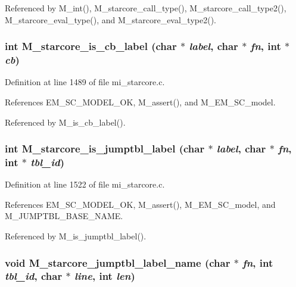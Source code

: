 Referenced by M\_\-int(), M\_\-starcore\_\-call\_\-type(), M\_\-starcore\_\-call\_\-type2(), M\_\-starcore\_\-eval\_\-type(), and M\_\-starcore\_\-eval\_\-type2().
\subsubsection{\setlength{\rightskip}{0pt plus 5cm}int M\_\-starcore\_\-is\_\-cb\_\-label (char $\ast$ {\em label}, char $\ast$ {\em fn}, int $\ast$ {\em cb})}\label{m__starcore_8h_66167aef621ee91b3dbbf9a29b918aa9}




Definition at line 1489 of file mi\_\-starcore.c.

References EM\_\-SC\_\-MODEL\_\-OK, M\_\-assert(), and M\_\-EM\_\-SC\_\-model.

Referenced by M\_\-is\_\-cb\_\-label().
\subsubsection{\setlength{\rightskip}{0pt plus 5cm}int M\_\-starcore\_\-is\_\-jumptbl\_\-label (char $\ast$ {\em label}, char $\ast$ {\em fn}, int $\ast$ {\em tbl\_\-id})}\label{m__starcore_8h_812a1b48518c064ee77487911f1d4bb1}




Definition at line 1522 of file mi\_\-starcore.c.

References EM\_\-SC\_\-MODEL\_\-OK, M\_\-assert(), M\_\-EM\_\-SC\_\-model, and M\_\-JUMPTBL\_\-BASE\_\-NAME.

Referenced by M\_\-is\_\-jumptbl\_\-label().
\subsubsection{\setlength{\rightskip}{0pt plus 5cm}void M\_\-starcore\_\-jumptbl\_\-label\_\-name (char $\ast$ {\em fn}, int {\em tbl\_\-id}, char $\ast$ {\em line}, int {\em len})}\label{m__starcore_8h_114735d22d67aec77ec867326fdd0f21}




